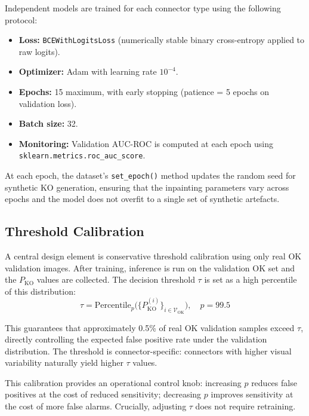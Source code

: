 \documentclass[11pt,a4paper,draft]{article}
\begin{document}
Independent models are trained for each connector type using the following protocol:

\begin{itemize}[nosep]
    \item \textbf{Loss:} \texttt{BCEWithLogitsLoss} (numerically stable binary cross-entropy applied to raw logits).
    \item \textbf{Optimizer:} Adam with learning rate $10^{-4}$.
    \item \textbf{Epochs:} 15 maximum, with early stopping (patience = 5 epochs on validation loss).
    \item \textbf{Batch size:} 32.
    \item \textbf{Monitoring:} Validation AUC-ROC is computed at each epoch using \texttt{sklearn.metrics.roc\_auc\_score}.
\end{itemize}

At each epoch, the dataset's \texttt{set\_epoch()} method updates the random seed for synthetic KO generation, ensuring that the inpainting parameters vary across epochs and the model does not overfit to a single set of synthetic artefacts.

\subsection{Threshold Calibration}

A central design element is conservative threshold calibration using only real OK validation images. After training, inference is run on the validation OK set and the $P_{\mathrm{KO}}$ values are collected. The decision threshold $\tau$ is set as a high percentile of this distribution:
\begin{equation}
    \tau = \mathrm{Percentile}_{p}\bigl(\{P_{\mathrm{KO}}^{(i)}\}_{i \in \mathcal{V}_{\mathrm{OK}}}\bigr), \quad p = 99.5
\end{equation}

This guarantees that approximately 0.5\% of real OK validation samples exceed $\tau$, directly controlling the expected false positive rate under the validation distribution. The threshold is connector-specific: connectors with higher visual variability naturally yield higher $\tau$ values.

This calibration provides an operational control knob: increasing $p$ reduces false positives at the cost of reduced sensitivity; decreasing $p$ improves sensitivity at the cost of more false alarms. Crucially, adjusting $\tau$ does not require retraining.
\end{document}
